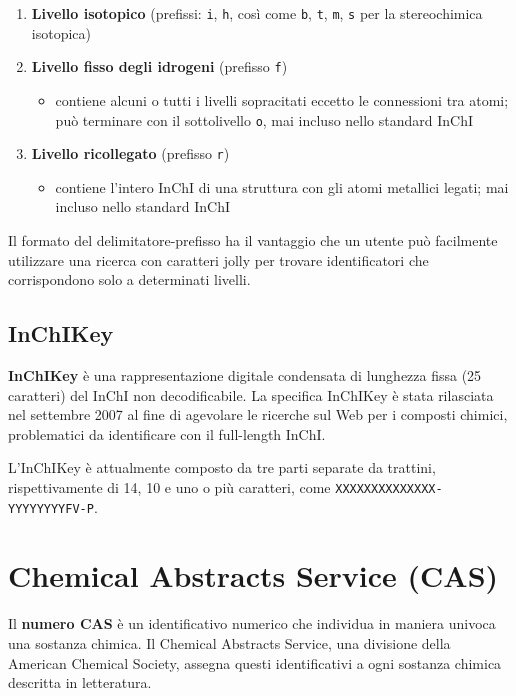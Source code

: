 \begin{enumerate}
\begin{itemize}
	      \end{itemize}
	\item \textbf{Livello isotopico} (prefissi: \verb|i|, \verb|h|, così come \verb|b|, \verb|t|, \verb|m|, \verb|s| per la stereochimica isotopica)
	\item \textbf{Livello fisso degli idrogeni} (prefisso \verb|f|)
	      \begin{itemize}
		      \item contiene alcuni o tutti i livelli sopracitati eccetto le connessioni tra atomi; può terminare con il sottolivello \verb|o|, mai incluso nello standard InChI
	      \end{itemize}
	\item \textbf{Livello ricollegato} (prefisso \verb|r|)
	      \begin{itemize}
		      \item contiene l'intero InChI di una struttura con gli atomi metallici legati; mai incluso nello standard InChI
	      \end{itemize}
\end{enumerate}

Il formato del delimitatore-prefisso ha il vantaggio che un utente può facilmente utilizzare una ricerca con caratteri jolly per trovare identificatori che corrispondono solo a determinati livelli.

\subsection{InChIKey}
\textbf{InChIKey} è una rappresentazione digitale condensata di lunghezza fissa (25 caratteri) del InChI non decodificabile. La specifica InChIKey è stata rilasciata nel settembre 2007 al fine di agevolare le ricerche sul Web per i composti chimici, problematici da identificare con il full-length InChI.

L'InChIKey è attualmente composto da tre parti separate da trattini, rispettivamente di 14, 10 e uno o più caratteri, come \verb|XXXXXXXXXXXXXX-YYYYYYYYFV-P|.


\section{Chemical Abstracts Service (CAS)}\label{sec:CAS}
Il \textbf{numero CAS} è un identificativo numerico che individua in maniera univoca una sostanza chimica. Il Chemical Abstracts Service, una divisione della American Chemical Society, assegna questi identificativi a ogni sostanza chimica descritta in letteratura.


